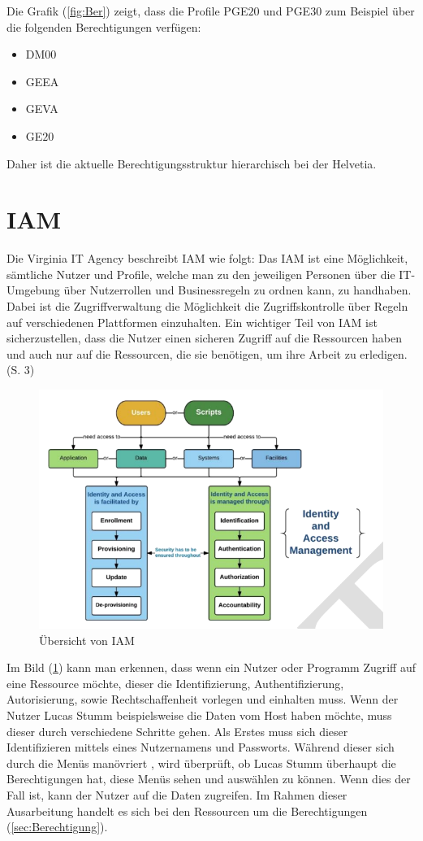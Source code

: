 \newpage
Die Grafik (\ref{fig:Ber}) zeigt, dass die Profile PGE$20$ und PGE$30$ zum Beispiel über die folgenden Berechtigungen verfügen:
\begin{itemize}
	\item DM$00$
	\item GEEA
	\item GEVA
	\item GE$20$
\end{itemize}
Daher ist die aktuelle Berechtigungsstruktur hierarchisch bei der Helvetia.


\section{IAM}
\label{subsec:IAM}
Die Virginia IT Agency beschreibt IAM wie folgt: Das \ac{IAM} ist eine Möglichkeit, sämtliche Nutzer und Profile, welche man zu den jeweiligen Personen über die IT-Umgebung über Nutzerrollen und Businessregeln zu ordnen kann, zu handhaben. Dabei ist die Zugriffverwaltung die Möglichkeit die Zugriffskontrolle über Regeln auf verschiedenen Plattformen einzuhalten. Ein wichtiger Teil von \ac{IAM} ist sicherzustellen, dass die Nutzer einen sicheren Zugriff auf die Ressourcen haben und auch nur auf die Ressourcen, die sie benötigen, um ihre Arbeit zu erledigen. \cite{Virg07} (S. 3)
\begin{figure}[h!]
 \centering
 \includegraphics[width=1\textwidth]{gfx/Picture/IAM.PNG}
 \caption{Übersicht von IAM \cite{Moha19}}
 \label{fig:IAM}
\end{figure}
Im Bild (\ref{fig:IAM}) kann man erkennen, dass wenn ein Nutzer oder Programm Zugriff auf eine Ressource möchte, dieser die Identifizierung, Authentifizierung, Autorisierung, sowie Rechtschaffenheit vorlegen und einhalten muss. \cite{Moha19}
Wenn der Nutzer Lucas Stumm beispielsweise die Daten vom Host haben möchte, muss dieser durch verschiedene Schritte gehen.
Als Erstes muss sich dieser Identifizieren mittels eines Nutzernamens und Passworts.
Während dieser sich durch die Menüs manövriert , wird überprüft, ob Lucas Stumm überhaupt die Berechtigungen hat, diese Menüs sehen und auswählen zu können.
Wenn dies der Fall ist, kann der Nutzer auf die Daten zugreifen.
\newline
Im Rahmen dieser Ausarbeitung handelt es sich bei den Ressourcen um die Berechtigungen (\ref{sec:Berechtigung}).

